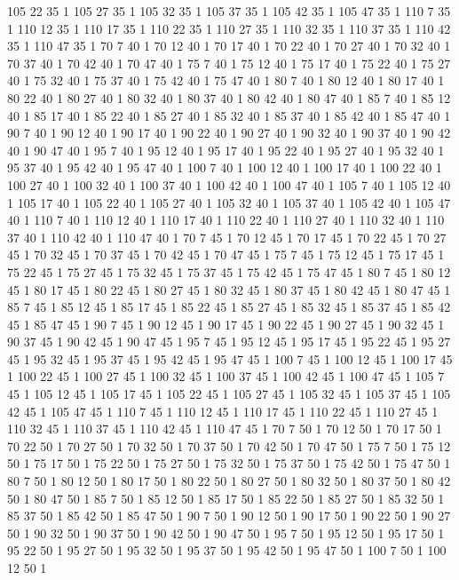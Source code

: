 105 22 35 1
105 27 35 1
105 32 35 1
105 37 35 1
105 42 35 1
105 47 35 1
110 7 35 1
110 12 35 1
110 17 35 1
110 22 35 1
110 27 35 1
110 32 35 1
110 37 35 1
110 42 35 1
110 47 35 1
70 7 40 1
70 12 40 1
70 17 40 1
70 22 40 1
70 27 40 1
70 32 40 1
70 37 40 1
70 42 40 1
70 47 40 1
75 7 40 1
75 12 40 1
75 17 40 1
75 22 40 1
75 27 40 1
75 32 40 1
75 37 40 1
75 42 40 1
75 47 40 1
80 7 40 1
80 12 40 1
80 17 40 1
80 22 40 1
80 27 40 1
80 32 40 1
80 37 40 1
80 42 40 1
80 47 40 1
85 7 40 1
85 12 40 1
85 17 40 1
85 22 40 1
85 27 40 1
85 32 40 1
85 37 40 1
85 42 40 1
85 47 40 1
90 7 40 1
90 12 40 1
90 17 40 1
90 22 40 1
90 27 40 1
90 32 40 1
90 37 40 1
90 42 40 1
90 47 40 1
95 7 40 1
95 12 40 1
95 17 40 1
95 22 40 1
95 27 40 1
95 32 40 1
95 37 40 1
95 42 40 1
95 47 40 1
100 7 40 1
100 12 40 1
100 17 40 1
100 22 40 1
100 27 40 1
100 32 40 1
100 37 40 1
100 42 40 1
100 47 40 1
105 7 40 1
105 12 40 1
105 17 40 1
105 22 40 1
105 27 40 1
105 32 40 1
105 37 40 1
105 42 40 1
105 47 40 1
110 7 40 1
110 12 40 1
110 17 40 1
110 22 40 1
110 27 40 1
110 32 40 1
110 37 40 1
110 42 40 1
110 47 40 1
70 7 45 1
70 12 45 1
70 17 45 1
70 22 45 1
70 27 45 1
70 32 45 1
70 37 45 1
70 42 45 1
70 47 45 1
75 7 45 1
75 12 45 1
75 17 45 1
75 22 45 1
75 27 45 1
75 32 45 1
75 37 45 1
75 42 45 1
75 47 45 1
80 7 45 1
80 12 45 1
80 17 45 1
80 22 45 1
80 27 45 1
80 32 45 1
80 37 45 1
80 42 45 1
80 47 45 1
85 7 45 1
85 12 45 1
85 17 45 1
85 22 45 1
85 27 45 1
85 32 45 1
85 37 45 1
85 42 45 1
85 47 45 1
90 7 45 1
90 12 45 1
90 17 45 1
90 22 45 1
90 27 45 1
90 32 45 1
90 37 45 1
90 42 45 1
90 47 45 1
95 7 45 1
95 12 45 1
95 17 45 1
95 22 45 1
95 27 45 1
95 32 45 1
95 37 45 1
95 42 45 1
95 47 45 1
100 7 45 1
100 12 45 1
100 17 45 1
100 22 45 1
100 27 45 1
100 32 45 1
100 37 45 1
100 42 45 1
100 47 45 1
105 7 45 1
105 12 45 1
105 17 45 1
105 22 45 1
105 27 45 1
105 32 45 1
105 37 45 1
105 42 45 1
105 47 45 1
110 7 45 1
110 12 45 1
110 17 45 1
110 22 45 1
110 27 45 1
110 32 45 1
110 37 45 1
110 42 45 1
110 47 45 1
70 7 50 1
70 12 50 1
70 17 50 1
70 22 50 1
70 27 50 1
70 32 50 1
70 37 50 1
70 42 50 1
70 47 50 1
75 7 50 1
75 12 50 1
75 17 50 1
75 22 50 1
75 27 50 1
75 32 50 1
75 37 50 1
75 42 50 1
75 47 50 1
80 7 50 1
80 12 50 1
80 17 50 1
80 22 50 1
80 27 50 1
80 32 50 1
80 37 50 1
80 42 50 1
80 47 50 1
85 7 50 1
85 12 50 1
85 17 50 1
85 22 50 1
85 27 50 1
85 32 50 1
85 37 50 1
85 42 50 1
85 47 50 1
90 7 50 1
90 12 50 1
90 17 50 1
90 22 50 1
90 27 50 1
90 32 50 1
90 37 50 1
90 42 50 1
90 47 50 1
95 7 50 1
95 12 50 1
95 17 50 1
95 22 50 1
95 27 50 1
95 32 50 1
95 37 50 1
95 42 50 1
95 47 50 1
100 7 50 1
100 12 50 1
